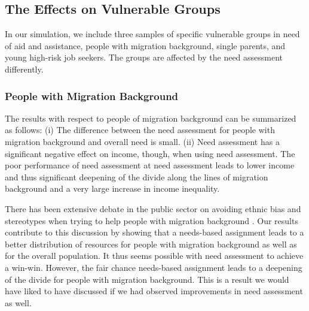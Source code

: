 \documentclass{article} %
\begin{document}
\subsection{The Effects on Vulnerable Groups}
\label{sec:results_groups}
In our simulation, we include three samples of specific vulnerable groups in need of aid and assistance, people with migration background, single parents, and young high-risk job seekers. The groups are affected by the need assessment differently.

\subsubsection{People with Migration Background}
\label{sec:results_migration}
\begin{table}[!ht]
\centering
\label{tab:migration}
\end{table}
The results with respect to people of migration background can be summarized as follows: (i) The difference between the need assessment for people with migration background and overall need is small. (ii) Need assessment has a significant negative effect on income, though, when using need assessment. The poor performance of need assessment at need assessment leads to lower income and thus significant deepening of the divide along the lines of migration background and a very large increase in income inequality.

There has been extensive debate in the public sector on avoiding ethnic bias and stereotypes when trying to help people with migration background \citep{desiere2019statistical}. Our results contribute to this discussion by showing that a needs-based assignment leads to a better distribution of resources for people with migration background as well as for the overall population. It thus seems possible with need assessment to achieve a win-win. However, the fair chance needs-based assignment leads to a deepening of the divide for people with migration background. This is a result we would have liked to have discussed if we had observed improvements in need assessment as well. 
\end{document}
